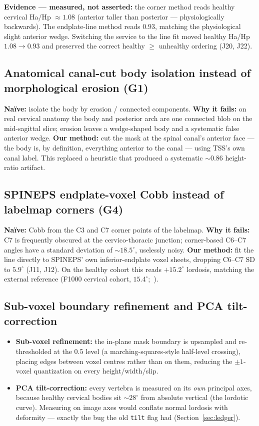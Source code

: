 \documentclass[11pt]{article}
\begin{document}
\textbf{Evidence --- measured, not asserted:} the corner method reads healthy cervical Ha/Hp $\approx
\mathbf{1.08}$ (anterior taller than posterior --- physiologically backwards). The endplate-line method
reads $\mathbf{0.93}$, matching the physiological slight anterior wedge. Switching the service to the
line fit moved healthy Ha/Hp $1.08 \to 0.93$ and preserved the correct healthy $\geq$ unhealthy ordering
(J20, J22).

\subsection{Anatomical canal-cut body isolation instead of morphological erosion (G1)}
\textbf{Na\"ive:} isolate the body by erosion / connected components. \textbf{Why it fails:} on real
cervical anatomy the body and posterior arch are one connected blob on the mid-sagittal slice; erosion
leaves a wedge-shaped body and a systematic false anterior wedge. \textbf{Our method:} cut the mask at
the spinal canal's anterior face --- the body is, by definition, everything anterior to the canal ---
using TSS's own canal label. This replaced a heuristic that produced a systematic $\sim 0.86$
height-ratio artifact.

\subsection{SPINEPS endplate-voxel Cobb instead of labelmap corners (G4)}
\textbf{Na\"ive:} Cobb from the C3 and C7 corner points of the labelmap. \textbf{Why it fails:} C7 is
frequently obscured at the cervico-thoracic junction; corner-based C6--C7 angles have a standard
deviation of $\sim 18.5^\circ$, uselessly noisy. \textbf{Our method:} fit the line directly to SPINEPS'
own inferior-endplate voxel sheets, dropping C6--C7 SD to $\mathbf{5.9^\circ}$ (J11, J12). On the
healthy cohort this reads $+15.2^\circ$ lordosis, matching the external reference (F1000 cervical
cohort, $15.4^\circ$;~\cite{f1000}).

\subsection{Sub-voxel boundary refinement and PCA tilt-correction}
\begin{itemize}
  \item \textbf{Sub-voxel refinement:} the in-plane mask boundary is upsampled and re-thresholded at the
  0.5 level (a marching-squares-style half-level crossing), placing edges between voxel centres rather
  than on them, reducing the $\pm 1$-voxel quantization on every height/width/slip.
  \item \textbf{PCA tilt-correction:} every vertebra is measured on its \emph{own} principal axes,
  because healthy cervical bodies sit $\sim 28^\circ$ from absolute vertical (the lordotic curve).
  Measuring on image axes would conflate normal lordosis with deformity --- exactly the bug the old
  \texttt{tilt} flag had (Section~\ref{sec:ledger}).
\end{itemize}
\end{document}
